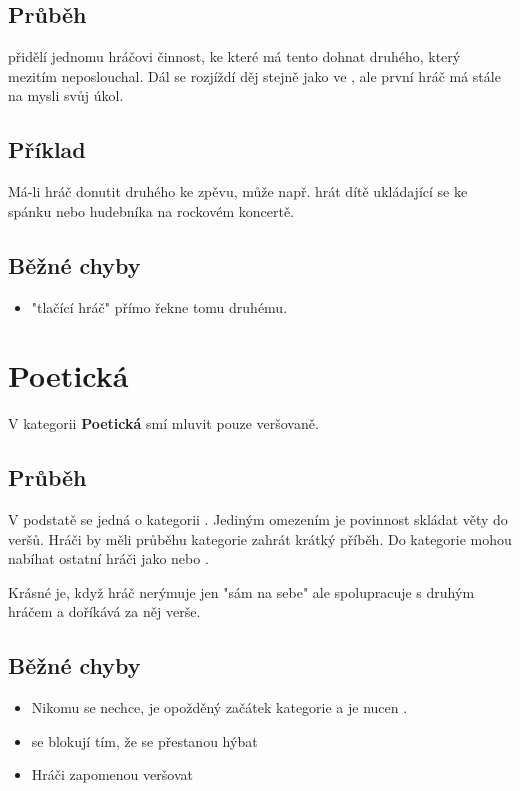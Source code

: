 \documentclass[main.tex]{subfiles}
\begin{document}
\subsection{Průběh}  přidělí jednomu hráčovi činnost, ke které  má tento dohnat druhého, který mezitím neposlouchal. Dál se rozjíždí děj stejně jako ve , ale první hráč má stále na mysli svůj úkol.  
 
\subsection{Příklad} Má-li hráč donutit druhého ke zpěvu, může např. hrát dítě ukládající se ke spánku nebo hudebníka na rockovém koncertě. 
  
\subsection{ Běžné chyby } \begin{itemize}
\item  "tlačící hráč"{} přímo řekne tomu druhému.
\end{itemize}
 
 
 
 
 
 
 
 
\needspace{5cm} \section{Poetická} \label{poetická}  
 
V kategorii \textbf{Poetická}{} smí  mluvit pouze veršovaně. 
 
\subsection{ Průběh } V podstatě se jedná o kategorii . Jediným omezením  je povinnost skládat věty do veršů. Hráči by měli průběhu kategorie zahrát krátký příběh. 
Do kategorie mohou nabíhat ostatní hráči jako  nebo . 
 
Krásné je, když hráč nerýmuje jen "sám na sebe"{} ale spolupracuje s druhým hráčem a doříkává za něj verše. 
 
\subsection{ Běžné chyby } \begin{itemize}
\item Nikomu se nechce, je opožděný začátek kategorie a  je nucen  .
\item {} se blokují tím, že se přestanou hýbat
\item Hráči zapomenou veršovat
\end{itemize}
 
\end{document}
